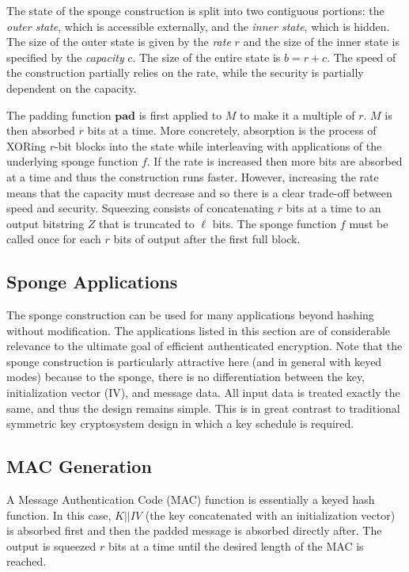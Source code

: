 The state of the sponge construction is split into two contiguous portions: the \emph{outer state}, which is accessible externally, and the \emph{inner state}, which is hidden.
The size of the outer state is given by the \emph{rate} $r$ and the size of the inner state is specified by the \emph{capacity} $c$.
The size of the entire state is $b = r + c$.
The speed of the construction partially relies on the rate, while the security is partially dependent on the capacity.

The padding function $\mathbf{pad}$ is first applied to $M$ to make it a multiple of $r$.
$M$ is then absorbed $r$ bits at a time.
More concretely, absorption is the process of XORing $r$-bit blocks into the state while interleaving with applications of the underlying sponge function $f$.
If the rate is increased then more bits are absorbed at a time and thus the construction runs faster.
However, increasing the rate means that the capacity must decrease and so there is a clear trade-off between speed and security.
Squeezing consists of concatenating $r$ bits at a time to an output bitstring $Z$ that is truncated to $\ell$ bits.
The sponge function $f$ must be called once for each $r$ bits of output after the first full block.

\subsection{Sponge Applications}
\label{sec:SpongeApplications}
The sponge construction can be used for many applications beyond hashing without modification.
The applications listed in this section are of considerable relevance to the ultimate goal of efficient authenticated encryption.
Note that the sponge construction is particularly attractive here (and in general with keyed modes) because to the sponge, there is no differentiation between the key, initialization vector (IV), and message data.
All input data is treated exactly the same, and thus the design remains simple.
This is in great contrast to traditional symmetric key cryptosystem design in which a key schedule is required.

\subsection{MAC Generation}
A Message Authentication Code (MAC) function is essentially a keyed hash function.
In this case, $K||IV$ (the key concatenated with an initialization vector) is absorbed first and then the padded message is absorbed directly after.
The output is squeezed $r$ bits at a time until the desired length of the MAC is reached.

